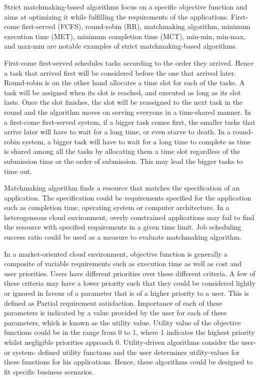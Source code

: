 \documentclass[times, 10pt,twocolumn]{article}
\begin{document}

Strict matchmaking-based algorithms focus on a specific objective function and aims at optimizing it while fulfilling the requirements of the applications. First-come first-served (FCFS), round-robin (RR), matchmaking algorithm, minimum execution time (MET), minimum completion time (MCT), min-min, min-max, and max-min\cite{heuristics} are notable examples of strict matchmaking-based algorithms. 

First-come first-served schedules tasks according to the order they arrived\cite{lee}. Hence a task that arrived first will be considered before the one that arrived later. Round-robin is on the other hand allocates a time slot for each of the tasks. A task will be assigned when its slot is reached, and executed as long as its slot lasts. Once the slot finishes, the slot will be reassigned to the next task in the round and the algorithm moves on serving everyone in a time-shared manner\cite{ast}. In a first-come first-served system, if a bigger task comes first, the smaller tasks that arrive later will have to wait for a long time, or even starve to death. In a round-robin system, a bigger task will have to wait for a long time to complete as time is shared among all the tasks by allocating them a time slot regardless of the submission time or the order of submission. This may lead the bigger tasks to time out.

Matchmaking algorithm finds a resource that matches the specification of an application. The specification could be requirements specified for the application such as completion time, operating system or computer architecture. In a heterogeneous cloud environment, overly constrained applications may fail to find the resource with specified requirements in a given time limit. Job scheduling success ratio could be used as a measure to evaluate matchmaking algorithm. 

In a market-oriented cloud environment, objective function is generally a composite of variable requirements such as execution time as well as cost and user priorities. Users have different priorities over these different criteria. A few of these criteria may have a lower priority such that they could be considered lightly or ignored in favour of a parameter that is of a higher priority to a user. This is defined as Partial requirement satisfaction. Importance of each of these parameters is indicated by a value provided by the user for each of these parameters, which is known as the utility value. Utility value of the objective functions could be in the range from 0 to 1, where 1 indicates the highest priority whilst negligible priorities approach 0. Utility-driven algorithms consider the user- or system- defined utility functions and the user determines utility-values for these functions for his applications. Hence, these algorithms could be designed to fit specific business scenarios.
\end{document}
